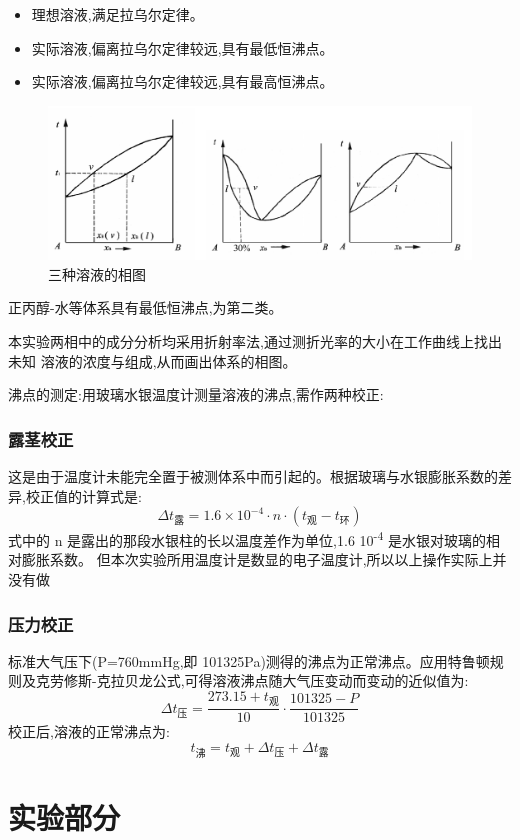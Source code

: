 \documentclass[11pt]{report}
\begin{document}
\begin{itemize}
\item 理想溶液,满足拉乌尔定律。
\item 实际溶液,偏离拉乌尔定律较远,具有最低恒沸点。
\item 实际溶液,偏离拉乌尔定律较远,具有最高恒沸点。
\end{itemize}
\begin{figure}[htbp]
\centering
\includegraphics[width=.9\linewidth]{../img/1.png}
\caption{\label{fig:org7519021}三种溶液的相图}
\end{figure}
正丙醇-水等体系具有最低恒沸点,为第二类。

本实验两相中的成分分析均采用折射率法,通过测折光率的大小在工作曲线上找出未知
溶液的浓度与组成,从而画出体系的相图。

沸点的测定:用玻璃水银温度计测量溶液的沸点,需作两种校正:
\section{露茎校正}
\label{sec:orgdea0b56}
    这是由于温度计未能完全置于被测体系中而引起的。根据玻璃与水银膨胀系数的差异,校正值的计算式是:
\[
\Delta t_{露}=1.6\times 10^{-4}\cdot n \cdot (t_{观}-t_{环})
\]
式中的 n 是露出的那段水银柱的长以温度差作为单位,1.6\texttimes{} 10\textsuperscript{-4} 是水银对玻璃的相对膨胀系数。
但本次实验所用温度计是数显的电子温度计,所以以上操作实际上并没有做
\section{压力校正}
\label{sec:orgd1f7c84}
    标准大气压下(P=760mmHg,即 101325Pa)测得的沸点为正常沸点。应用特鲁顿规则及克劳修斯-克拉贝龙公式,可得溶液沸点随大气压变动而变动的近似值为:
\[
\Delta t_{压}=\frac{273.15+t_{观}}{10}\cdot \frac{101325-P}{101325}
\]
校正后,溶液的正常沸点为:
\[
t_{沸}=t_{观}+\Delta t_{压}+\Delta t_{露}
\]



\part{实验部分}
\label{sec:org7646880}
\end{document}
